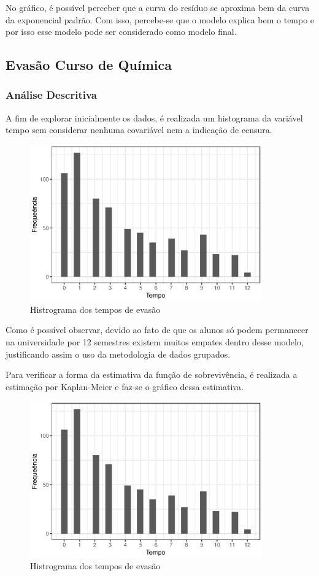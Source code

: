 \documentclass[a4paper,12pt]{article}
\begin{document}
No gráfico, é possível perceber que a curva do resíduo se aproxima bem da curva da exponencial padrão. Com isso, percebe-se que o modelo explica bem o tempo e por isso esse modelo pode ser considerado como modelo final.

\subsection{Evasão Curso de Química}
\subsubsection{Análise Descritiva}

A fim de explorar inicialmente os dados, é realizada um histograma da variável tempo sem considerar nenhuma covariável nem a indicação de censura.

\begin{figure}[H]
  \centering
  \includegraphics[width=10cm]{quim_hist}
  \caption{Histrograma dos tempos de evasão}
\end{figure}

Como é possível observar, devido ao fato de que os alunos só podem permanecer na universidade por 12 semestres existem muitos empates dentro desse modelo, justificando assim o uso da metodologia de dados grupados.

Para verificar a forma da estimativa da função de sobrevivência, é realizada a estimação por Kaplan-Meier e faz-se o gráfico dessa estimativa.

\begin{figure}[H]
  \centering
  \includegraphics[width=10cm]{quim_hist}
  \caption{Histrograma dos tempos de evasão}
\end{figure}


\newpage
{}




\nocite{*}
\end{document}
